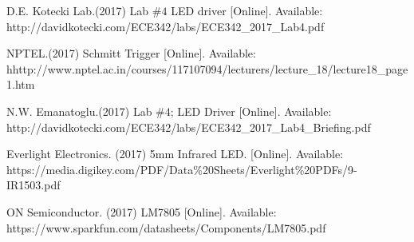 \documentclass{article}
\begin{document}
\begin{thebibliography}{00}

 D.E. Kotecki Lab.(2017) Lab $\#4$ LED driver [Online]. Available: http://davidkotecki.com/ECE342/labs/ECE342\_2017\_Lab4.pdf
\newline

 NPTEL.(2017) Schmitt Trigger [Online]. Available: hhttp://www.nptel.ac.in/courses/117107094/lecturers/lecture\_18/lecture18\_page1.htm
\newline

  N.W. Emanatoglu.(2017) Lab $\#4$; LED Driver [Online].
Available: 
http://davidkotecki.com/ECE342/labs/ECE342\_2017\_Lab4\_Briefing.pdf
\newline

 Everlight Electronics. (2017) 5mm Infrared LED. [Online]. Available:
https://media.digikey.com/PDF/Data\%20Sheets/Everlight\%20PDFs/9-IR1503.pdf
\newline

 ON Semiconductor. (2017) LM7805 [Online]. Available: 
https://www.sparkfun.com/datasheets/Components/LM7805.pdf
\newline



\end{thebibliography}
\end{document}

